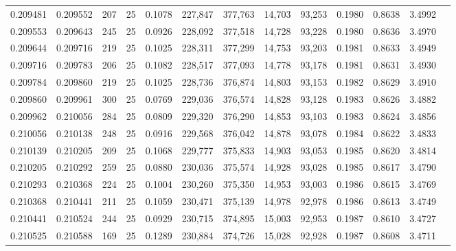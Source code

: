 \begin{tabular}{rrrrrrrrrrrrr}
0.209481 & 0.209552 &   207 &  25 &                                     0.1078 & 227,847 & 377,763 &  14,703 &  93,253 & 0.1980 & 0.8638 & 3.4992 \\
0.209553 & 0.209643 &   245 &  25 &                                     0.0926 & 228,092 & 377,518 &  14,728 &  93,228 & 0.1980 & 0.8636 & 3.4970 \\
0.209644 & 0.209716 &   219 &  25 &                                     0.1025 & 228,311 & 377,299 &  14,753 &  93,203 & 0.1981 & 0.8633 & 3.4949 \\
0.209716 & 0.209783 &   206 &  25 &                                     0.1082 & 228,517 & 377,093 &  14,778 &  93,178 & 0.1981 & 0.8631 & 3.4930 \\
0.209784 & 0.209860 &   219 &  25 &                                     0.1025 & 228,736 & 376,874 &  14,803 &  93,153 & 0.1982 & 0.8629 & 3.4910 \\
0.209860 & 0.209961 &   300 &  25 &                                     0.0769 & 229,036 & 376,574 &  14,828 &  93,128 & 0.1983 & 0.8626 & 3.4882 \\
0.209962 & 0.210056 &   284 &  25 &                                     0.0809 & 229,320 & 376,290 &  14,853 &  93,103 & 0.1983 & 0.8624 & 3.4856 \\
0.210056 & 0.210138 &   248 &  25 &                                     0.0916 & 229,568 & 376,042 &  14,878 &  93,078 & 0.1984 & 0.8622 & 3.4833 \\
0.210139 & 0.210205 &   209 &  25 &                                     0.1068 & 229,777 & 375,833 &  14,903 &  93,053 & 0.1985 & 0.8620 & 3.4814 \\
0.210205 & 0.210292 &   259 &  25 &                                     0.0880 & 230,036 & 375,574 &  14,928 &  93,028 & 0.1985 & 0.8617 & 3.4790 \\
0.210293 & 0.210368 &   224 &  25 &                                     0.1004 & 230,260 & 375,350 &  14,953 &  93,003 & 0.1986 & 0.8615 & 3.4769 \\
0.210368 & 0.210441 &   211 &  25 &                                     0.1059 & 230,471 & 375,139 &  14,978 &  92,978 & 0.1986 & 0.8613 & 3.4749 \\
0.210441 & 0.210524 &   244 &  25 &                                     0.0929 & 230,715 & 374,895 &  15,003 &  92,953 & 0.1987 & 0.8610 & 3.4727 \\
0.210525 & 0.210588 &   169 &  25 &                                     0.1289 & 230,884 & 374,726 &  15,028 &  92,928 & 0.1987 & 0.8608 & 3.4711 \\

\end{tabular}
